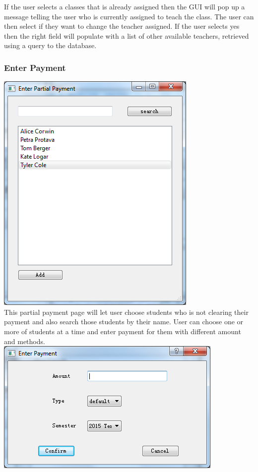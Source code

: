 If the user selects a classes that is already assigned then the GUI will pop up a message telling the user who is currently assigned to teach the class. The user can then select if they want to change the teacher assigned. If the user selects yes then the right field will populate with a list of other available teachers, retrieved using a query to the database.

\subsubsection{Enter Payment}
\includegraphics[scale=0.5]{pics/partial_pay_main.png}\\
This partial payment page will let user choose students who is not clearing their payment and also search those students by their name. User can choose one or more of students at a time and enter payment for them with different amount and methods.\\
\includegraphics[scale=0.5]{pics/partial_pay_sub.png}\\
